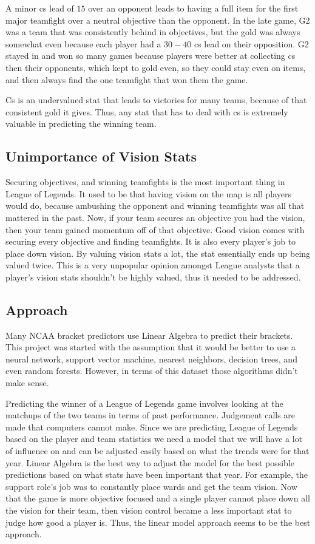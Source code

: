 \documentclass[11pt]{article}
\theoremstyle{plain}
\theoremstyle{definition}
\numberwithin{equation}{section}
\numberwithin{theorem}{section}
\numberwithin{lemma}{section}
\numberwithin{definition}{section}
\numberwithin{proposition}{section}
\numberwithin{corollary}{section}
\begin{document}
	
	A minor cs lead of $15$ over an opponent leads to having a full item for the first major teamfight over a neutral objective than the opponent. In the late game, G2 was a team that was consistently behind in objectives, but the gold was always somewhat even because each player had a $30-40$ cs lead on their opposition. G2 stayed in and won so many games because players were better at collecting cs then their opponents, which kept to gold even, so they could stay even on items, and then always find the one teamfight that won them the game.
	
	
	Cs is an undervalued stat that leads to victories for many teams, because of that consistent gold it gives. Thus, any stat that has to deal with cs is extremely valuable in predicting the winning team.
\subsection{Unimportance of Vision Stats}
	Securing objectives, and winning teamfights is the most important thing in League of Legends. It used to be that having vision on the map is all players would do, because ambushing the opponent and winning teamfights was all that mattered in the past. Now, if your team secures an objective you had the vision, then your team gained momentum off of that objective. Good vision comes with securing every objective and finding teamfights. It is also every player's job to place down vision. By valuing vision stats a lot, the stat essentially ends up being valued twice. This is a very unpopular opinion amongst League analysts that a player's vision stats shouldn't be highly valued, thus it needed to be addressed.
\subsection{Approach}
	Many NCAA bracket predictors use Linear Algebra to predict their brackets. This project was started with the assumption that it would be better to use a neural network, support vector machine, nearest neighbors, decision trees, and even random forests. However, in terms of this dataset those algorithms didn't make sense.
	
	
	Predicting the winner of a League of Legends game involves looking at the matchups of the two teams in terms of past performance. Judgement calls are made that computers cannot make. Since we are predicting League of Legends based on the player and team statistics we need a model that we will have a lot of influence on and can be adjusted easily based on what the trends were for that year. Linear Algebra is the best way to adjust the model for the best possible predictions based on what stats have been important that year. For example, the support role's job was to constantly place wards and get the team vision. Now that the game is more objective focused and a single player cannot place down all the vision for their team, then vision control became a less important stat to judge how good a player is. Thus, the linear model approach seems to be the best approach.																								
\end{document}
